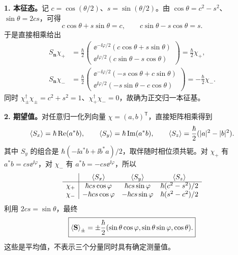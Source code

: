 \begin{checkedsolution}
\textbf{1. 本征态。}记 $c=\cos(\theta/2)$、$s=\sin(\theta/2)$。由
$\cos\theta=c^2-s^2$、$\sin\theta=2cs$，可得
\begin{equation}
  c\cos\theta+s\sin\theta=c,\qquad
  c\sin\theta-s\cos\theta=s.
\end{equation}
于是直接相乘给出
\begin{align}
  S_{\mathbf n}\chi_+
   &=\frac\hbar2\begin{pmatrix}
     \ee^{-\ii\varphi/2}(c\cos\theta+s\sin\theta)\\
     \ee^{\ii\varphi/2}(c\sin\theta-s\cos\theta)
     \end{pmatrix}=\frac\hbar2\chi_+,\\
  S_{\mathbf n}\chi_-
   &=\frac\hbar2\begin{pmatrix}
     \ee^{-\ii\varphi/2}(-s\cos\theta+c\sin\theta)\\
     \ee^{\ii\varphi/2}(-s\sin\theta-c\cos\theta)
     \end{pmatrix}=-\frac\hbar2\chi_-.
\end{align}
同时 $\chi_\pm^\dagger\chi_\pm=c^2+s^2=1$、$\chi_+^\dagger\chi_-=0$，故确为正交归一本征基。

\textbf{2. 期望值。}对任意归一化列向量 $\chi=(a,b)^{\mathsf T}$，直接矩阵相乘得到
\begin{equation}
  \left\langle S_x \right\rangle=\hbar\operatorname{Re}(a^*b),\qquad
  \left\langle S_y \right\rangle=\hbar\operatorname{Im}(a^*b),\qquad
  \left\langle S_z \right\rangle=\frac\hbar2(|a|^2-|b|^2).
\end{equation}
其中 $S_y$ 的组合是 $\hbar(-\ii a^*b+\ii b^*a)/2$，取伴随时相位须共轭。对 $\chi_+$ 有 $a^*b=cs\ee^{\ii\varphi}$，对 $\chi_-$ 有 $a^*b=-cs\ee^{\ii\varphi}$，所以
\begin{equation}
  \begin{array}{c|ccc}
    &\left\langle S_x \right\rangle&\left\langle S_y \right\rangle&\left\langle S_z \right\rangle\\ \hline
    \chi_+&\hbar cs\cos\varphi&\hbar cs\sin\varphi&\hbar(c^2-s^2)/2\\
    \chi_-&-\hbar cs\cos\varphi&-\hbar cs\sin\varphi&\hbar(s^2-c^2)/2
  \end{array}
\end{equation}
利用 $2cs=\sin\theta$，最终
\begin{equation}
  \boxed{\left\langle \mathbf S \right\rangle_\pm
    =\pm\frac\hbar2(\sin\theta\cos\varphi,\sin\theta\sin\varphi,\cos\theta).}
\end{equation}
这些是平均值，不表示三个分量同时具有确定测量值。
\end{checkedsolution}

